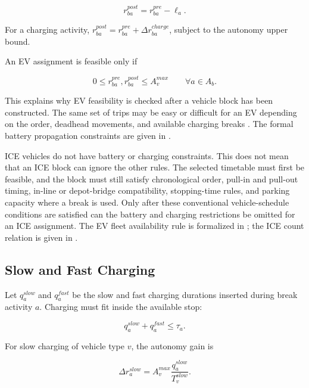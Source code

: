 \begin{equation}
r_{ba}^{post}=r_{ba}^{pre}-\ell_a.
\label{eq:problem-battery-update}
\end{equation}

For a charging activity, \(r_{ba}^{post}=r_{ba}^{pre}+\Delta r_{ba}^{charge}\),
subject to the autonomy upper bound.

An EV assignment is feasible only if

\begin{equation}
0\le r_{ba}^{pre},r_{ba}^{post}\le A^{max}_v
\qquad
\forall a\in A_b.
\label{eq:problem-battery-feasible}
\end{equation}

This explains why EV feasibility is checked after a vehicle block has been
constructed. The same set of trips may be easy or difficult for an EV depending
on the order, deadhead movements, and available charging breaks
\cite{li2014,kooten2017,tang2019}. The formal battery propagation constraints
are given in .

ICE vehicles do not have battery or charging constraints. This does not mean
that an ICE block can ignore the other rules. The selected timetable must first
be feasible, and the block must still satisfy chronological order, pull-in and
pull-out timing, in-line or depot-bridge compatibility, stopping-time rules, and
parking capacity where a break is used. Only after these conventional
vehicle-schedule conditions are satisfied can the battery and charging
restrictions be omitted for an ICE assignment. The EV fleet availability rule is
formalized in ; the ICE count relation is given in
.

\subsection{Slow and Fast Charging}

Let \(q_a^{slow}\) and \(q_a^{fast}\) be the slow and fast charging durations
inserted during break activity \(a\). Charging must fit inside the available
stop:

\begin{equation}
q_a^{slow}+q_a^{fast}\le \tau_a.
\label{eq:problem-charge-duration}
\end{equation}

For slow charging of vehicle type \(v\), the autonomy gain is

\begin{equation}
\Delta r_a^{slow}
=A^{max}_v\frac{q_a^{slow}}{T^{slow}_v}.
\label{eq:problem-slow-charge}
\end{equation}

